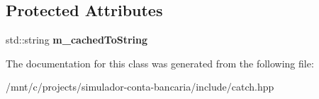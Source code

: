 \subsection*{Protected Attributes}
\begin{DoxyCompactItemize}
\item 
\mbox{\label{classCatch_1_1Matchers_1_1Impl_1_1MatcherUntypedBase_a951095c462657e7097a9a6dc4dde813f}} 
std\+::string {\bfseries m\+\_\+cached\+To\+String}
\end{DoxyCompactItemize}


The documentation for this class was generated from the following file\+:\begin{DoxyCompactItemize}
\item 
/mnt/c/projects/simulador-\/conta-\/bancaria/include/catch.\+hpp\end{DoxyCompactItemize}
